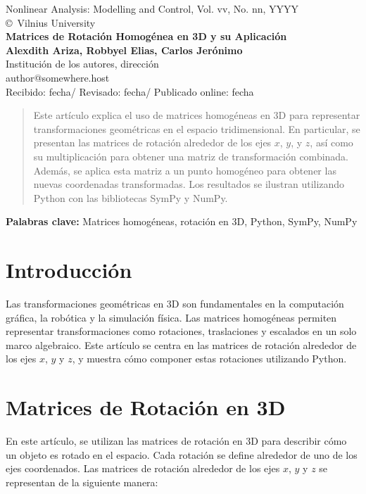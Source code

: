 \documentclass[a4paper, 10pt]{article}
\begin{document}
\begin{center}
Nonlinear Analysis: Modelling and Control, Vol. vv, No. nn, YYYY\\
\copyright\ Vilnius University\\[24pt]
\LARGE
\textbf{Matrices de Rotación Homogénea en 3D y su Aplicación}\\[6pt]
\small
\textbf {Alexdith Ariza, Robbyel Elias, Carlos Jerónimo}\\[6pt]
Institución de los autores, dirección\\ author@somewhere.host\\[6pt]
Recibido: fecha\quad/\quad
Revisado: fecha\quad/\quad
Publicado online: fecha
\end{center}

\begin{abstract}
Este artículo explica el uso de matrices homogéneas en 3D para representar transformaciones geométricas en el espacio tridimensional. En particular, se presentan las matrices de rotación alrededor de los ejes \(x\), \(y\), y \(z\), así como su multiplicación para obtener una matriz de transformación combinada. Además, se aplica esta matriz a un punto homogéneo para obtener las nuevas coordenadas transformadas. Los resultados se ilustran utilizando Python con las bibliotecas SymPy y NumPy.
\end{abstract}

\textbf{Palabras clave:} Matrices homogéneas, rotación en 3D, Python, SymPy, NumPy

\section{Introducción}
Las transformaciones geométricas en 3D son fundamentales en la computación gráfica, la robótica y la simulación física. Las matrices homogéneas permiten representar transformaciones como rotaciones, traslaciones y escalados en un solo marco algebraico. Este artículo se centra en las matrices de rotación alrededor de los ejes \(x\), \(y\) y \(z\), y muestra cómo componer estas rotaciones utilizando Python.

\section{Matrices de Rotación en 3D}
En este artículo, se utilizan las matrices de rotación en 3D para describir cómo un objeto es rotado en el espacio. Cada rotación se define alrededor de uno de los ejes coordenados. Las matrices de rotación alrededor de los ejes \(x\), \(y\) y \(z\) se representan de la siguiente manera:
\end{document}
